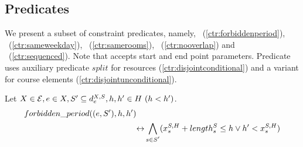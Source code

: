 \subsection{{\UTP} Predicates}
\label{sec:model-predicates}


We present a subset of {\UTP} constraint predicates, namely,
\texttt{\FORBIDDENPERIOD}~(\ref{ctr:forbiddenperiod}),
\texttt{\SAMEWEEKDAY}~(\ref{ctr:sameweekday}), 
\texttt{\SAMEROOMS}~(\ref{ctr:samerooms}),
\texttt{\NOOVERLAP}~(\ref{ctr:nooverlap}) 
and \texttt{\SEQUENCED}~(\ref{ctr:sequenced}).
Note that \texttt{\FORBIDDENPERIOD} accepts start and end point parameters.
Predicate \texttt{\NOOVERLAP}
uses auxiliary predicate $split$ for resources (\ref{ctr:disjointconditional})
and a variant for course elements (\ref{ctr:disjointunconditional}).



{\noindent}Let $X\in\mathcal{E}, e\in X,S'\subseteq d^{X,S}_{e}, h,h'\in H\ (h<h')$.
\begin{equation}
\begin{split}
forbidden\_period((e,S'),h,h')
\ \ \ &\\
\leftrightarrow
&\bigwedge_{\substack{s\in S'}}
(x^{S,H}_{s}+length^{S}_{s}\leq h
\vee
h'<x^{S,H}_{s}
)
\label{ctr:forbiddenperiod}
\end{split}
\end{equation}

